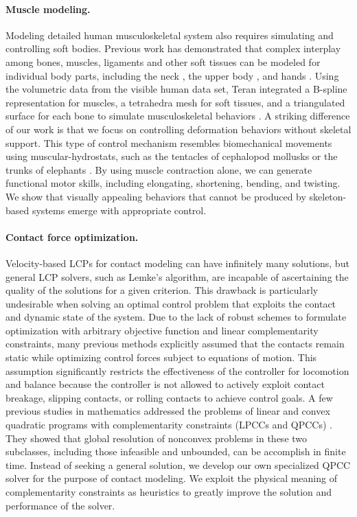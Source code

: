 \paragraph{Muscle modeling.} Modeling detailed human musculoskeletal system also requires
simulating and controlling soft bodies. Previous work has
demonstrated that complex interplay among bones, muscles, ligaments and
other soft tissues can be modeled for individual body parts, including
the neck \cite{Lee:2006}, the upper body
\cite{Zordan:2006,Dilorenzo:2008,Lee:2009:CBM}, and hands
\cite{Tsang:2005,Sueda:2008}. Using the volumetric data from the
visible human data set, Teran \etal integrated a B-spline
representation for muscles, a tetrahedra mesh for soft tissues, and a
triangulated surface for each bone to simulate musculoskeletal
behaviors \cite{Teran:2003,Teran:2005}. A striking difference of our
work is that we focus on controlling deformation behaviors without
skeletal support. This type of control mechanism resembles
biomechanical movements using muscular-hydrostats, such as the
tentacles of cephalopod mollusks or the trunks of elephants
\cite{Kier:1985}. By using muscle contraction alone, we can generate
functional motor skills, including elongating, shortening,
bending, and twisting. We show that visually appealing behaviors that
cannot be produced by skeleton-based systems emerge with
appropriate control.

\paragraph{Contact force optimization.} Velocity-based LCPs for contact
modeling can have infinitely many solutions, but general LCP solvers,
such as Lemke's algorithm, are incapable of ascertaining the quality of
the solutions for a given criterion. This drawback is particularly
undesirable when solving an optimal control problem that exploits the
contact and dynamic state of the system. Due to the lack of robust
schemes to formulate optimization with arbitrary objective function
and linear complementarity constraints, many previous methods
explicitly assumed that the contacts remain static
\cite{Abe:2007,Jain:2009,Kim:2011:DCO} while optimizing control forces
subject to equations of motion. This assumption significantly
restricts the effectiveness of the controller for locomotion and balance
because the controller is not allowed to actively exploit contact
breakage, slipping contacts, or rolling contacts to achieve control
goals. A few previous studies in mathematics addressed the problems of
linear and convex quadratic programs with complementarity constraints
(LPCCs and QPCCs) \cite{Hu:2008,Bai:2011}. They showed that global resolution of
nonconvex problems in these two subclasses, including those infeasible
and unbounded, can be accomplish in finite time. Instead of seeking
a general solution, we develop our own specialized QPCC solver for
the purpose of contact modeling. We exploit the physical meaning of
complementarity constraints as heuristics to greatly improve the
solution and performance of the solver.

